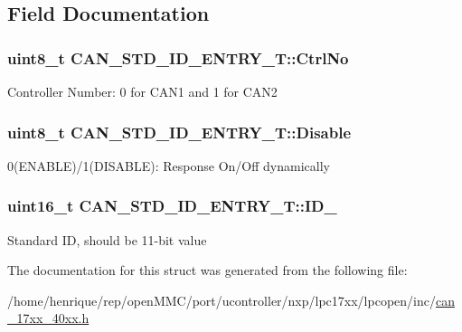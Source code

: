 \subsection{Field Documentation}
\hypertarget{structCAN__STD__ID__ENTRY__T_a5361d52d7fcdc1a8598550836b91bb97}{
\subsubsection[{Ctrl\-No}]{\setlength{\rightskip}{0pt plus 5cm}uint8\-\_\-t C\-A\-N\-\_\-\-S\-T\-D\-\_\-\-I\-D\-\_\-\-E\-N\-T\-R\-Y\-\_\-\-T\-::\-Ctrl\-No}}\label{structCAN__STD__ID__ENTRY__T_a5361d52d7fcdc1a8598550836b91bb97}
Controller Number\-: 0 for C\-A\-N1 and 1 for C\-A\-N2 \hypertarget{structCAN__STD__ID__ENTRY__T_a02dc64b0ae7683331953979d1ed9dce7}{
\subsubsection[{Disable}]{\setlength{\rightskip}{0pt plus 5cm}uint8\-\_\-t C\-A\-N\-\_\-\-S\-T\-D\-\_\-\-I\-D\-\_\-\-E\-N\-T\-R\-Y\-\_\-\-T\-::\-Disable}}\label{structCAN__STD__ID__ENTRY__T_a02dc64b0ae7683331953979d1ed9dce7}
0(E\-N\-A\-B\-L\-E)/1(D\-I\-S\-A\-B\-L\-E)\-: Response On/\-Off dynamically \hypertarget{structCAN__STD__ID__ENTRY__T_a7cb55fad6132fbd461a568ff724f9ca1}{
\subsubsection[{I\-D\-\_\-11}]{\setlength{\rightskip}{0pt plus 5cm}uint16\-\_\-t C\-A\-N\-\_\-\-S\-T\-D\-\_\-\-I\-D\-\_\-\-E\-N\-T\-R\-Y\-\_\-\-T\-::\-I\-D\-\_}}\label{structCAN__STD__ID__ENTRY__T_a7cb55fad6132fbd461a568ff724f9ca1}
Standard I\-D, should be 11-\/bit value 

The documentation for this struct was generated from the following file\-:\begin{DoxyCompactItemize}
\item 
/home/henrique/rep/open\-M\-M\-C/port/ucontroller/nxp/lpc17xx/lpcopen/inc/\hyperlink{can__17xx__40xx_8h}{can\-\_\-17xx\-\_\-40xx.\-h}\end{DoxyCompactItemize}
